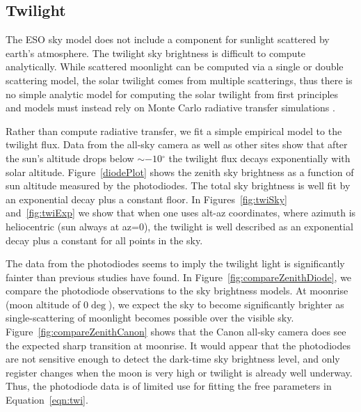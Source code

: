 \documentclass{emulateapj}  %
\newcommand\degree{{^\circ}}
\begin{document}
\subsection{Twilight}

The ESO sky model does not include a component for sunlight scattered by earth's atmosphere.  The twilight sky brightness is difficult to compute analytically.  While scattered moonlight can be computed via a single or double scattering model, the solar twilight comes from multiple scatterings, thus there is no simple analytic model for computing the solar twilight from first principles and models must instead rely on Monte Carlo radiative transfer simulations \citep{Patat06}.

Rather than compute radiative transfer, we fit a simple empirical model to the twilight flux.  Data from the all-sky camera as well as other sites show that after the sun's altitude drops below $\sim-10\degree$ the twilight flux decays exponentially with solar altitude. Figure~\ref{diodePlot} shows the zenith sky brightness as a function of sun altitude measured by the photodiodes. The total sky brightness is well fit by an exponential decay plus a constant floor.  In Figures~\ref{fig:twiSky} and~\ref{fig:twiExp} we show that when one uses alt-az coordinates, where azimuth is heliocentric (sun always at az=0), the twilight is well described as an exponential decay plus a constant for all points in the sky.

The data from the photodiodes seems to imply the twilight light is significantly fainter than previous studies have found. In Figure~\ref{fig:compareZenithDiode}, we compare the photodiode observations to the sky brightness models. At moonrise (moon altitude of 0$\deg$), we expect the sky to become significantly brighter as single-scattering of moonlight becomes possible over the visible sky.  Figure~\ref{fig:compareZenithCanon} shows that the Canon all-sky camera does see the expected sharp transition at moonrise.  It would appear that the photodiodes are not sensitive enough to detect the dark-time sky brightness level, and only register changes when the moon is very high or twilight is already well underway. Thus, the photodiode data is of limited use for fitting the free parameters in Equation~\ref{eqn:twi}.





\begin{figure*}
  \caption{Photodiode observations of zenith at the LSST site. The light gray points show individual measurements, while the yellow points are the median-binned data. The solid blue line shows the best fit exponential decay plus constant. The green vertical line marks 12 degree twilight, and the dashed vertical blue line shows where the data was not used because the detector was often saturated at that point. \label{diodePlot}}
\end{figure*}
\end{document}
